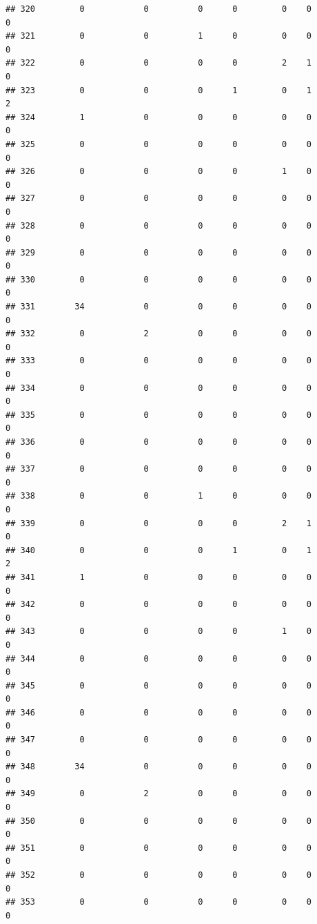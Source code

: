 \documentclass[
]{article}
\begin{document}
\begin{verbatim}
## 320         0            0          0      0         0    0              0
## 321         0            0          1      0         0    0              0
## 322         0            0          0      0         2    1              0
## 323         0            0          0      1         0    1              2
## 324         1            0          0      0         0    0              0
## 325         0            0          0      0         0    0              0
## 326         0            0          0      0         1    0              0
## 327         0            0          0      0         0    0              0
## 328         0            0          0      0         0    0              0
## 329         0            0          0      0         0    0              0
## 330         0            0          0      0         0    0              0
## 331        34            0          0      0         0    0              0
## 332         0            2          0      0         0    0              0
## 333         0            0          0      0         0    0              0
## 334         0            0          0      0         0    0              0
## 335         0            0          0      0         0    0              0
## 336         0            0          0      0         0    0              0
## 337         0            0          0      0         0    0              0
## 338         0            0          1      0         0    0              0
## 339         0            0          0      0         2    1              0
## 340         0            0          0      1         0    1              2
## 341         1            0          0      0         0    0              0
## 342         0            0          0      0         0    0              0
## 343         0            0          0      0         1    0              0
## 344         0            0          0      0         0    0              0
## 345         0            0          0      0         0    0              0
## 346         0            0          0      0         0    0              0
## 347         0            0          0      0         0    0              0
## 348        34            0          0      0         0    0              0
## 349         0            2          0      0         0    0              0
## 350         0            0          0      0         0    0              0
## 351         0            0          0      0         0    0              0
## 352         0            0          0      0         0    0              0
## 353         0            0          0      0         0    0              0

\end{verbatim}
\end{document}
